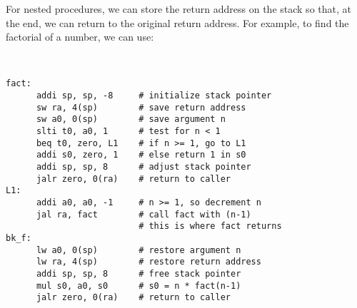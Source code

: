 For nested procedures, we can store the return address on the stack so that, at the end, we can return to the original return address. For example, to find the factorial of a number, we can use:
\begin{codeBlock}~
\begin{verbatim}
fact: 
      addi sp, sp, -8     # initialize stack pointer
      sw ra, 4(sp)        # save return address
      sw a0, 0(sp)        # save argument n
      slti t0, a0, 1      # test for n < 1
      beq t0, zero, L1    # if n >= 1, go to L1
      addi s0, zero, 1    # else return 1 in s0
      addi sp, sp, 8      # adjust stack pointer
      jalr zero, 0(ra)    # return to caller
L1: 
      addi a0, a0, -1     # n >= 1, so decrement n
      jal ra, fact        # call fact with (n-1)
                          # this is where fact returns
bk_f:
      lw a0, 0(sp)        # restore argument n
      lw ra, 4(sp)        # restore return address
      addi sp, sp, 8      # free stack pointer
      mul s0, a0, s0      # s0 = n * fact(n-1)
      jalr zero, 0(ra)    # return to caller
\end{verbatim}
\end{codeBlock}
